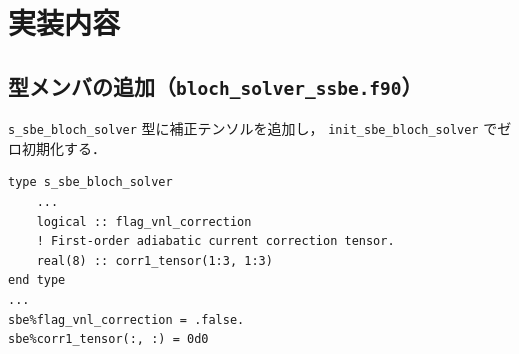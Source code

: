 \documentclass[dvipdfmx,a4paper,11pt]{jsarticle}
\newcommand{\file}[1]{\texttt{#1}}
\begin{document}
\section{実装内容}
\subsection{型メンバの追加（\file{bloch\_solver\_ssbe.f90}）}
\texttt{s\_sbe\_bloch\_solver} 型に補正テンソルを追加し，
\texttt{init\_sbe\_bloch\_solver} でゼロ初期化する．
\begin{lstlisting}[caption={型メンバの追加}]
type s_sbe_bloch_solver
    ...
    logical :: flag_vnl_correction
    ! First-order adiabatic current correction tensor.
    real(8) :: corr1_tensor(1:3, 1:3)
end type
...
sbe%flag_vnl_correction = .false.
sbe%corr1_tensor(:, :) = 0d0
\end{lstlisting}
\end{document}
